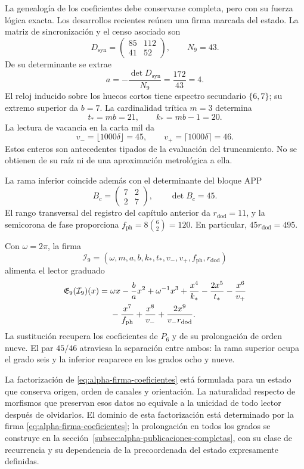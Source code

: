 La genealogía de los coeficientes debe conservarse completa, pero con su
fuerza lógica exacta. Los desarrollos recientes reúnen una firma marcada
del estado. La matriz de sincronización y el censo asociado son
\[
 D_{\mathrm{syn}}=\begin{pmatrix}85&112\\41&52\end{pmatrix},
 \qquad N_9=43.
\]
De su determinante se extrae
\[
 a=-\frac{\det D_{\mathrm{syn}}}{N_9}
   =\frac{172}{43}=4.
\]
El reloj inducido sobre los huecos cortos tiene espectro secundario
\(\{6,7\}\); su extremo superior da \(b=7\). La cardinalidad
trítica \(m=3\) determina
\[
 t_*=mb=21,\qquad k_*=mb-1=20.
\]
La lectura de vacancia en la carta mil da
\[
 v_-=\lfloor1000\delta\rfloor=45,\qquad
 v_+=\lceil1000\delta\rceil=46.
\]
Estos enteros son antecedentes tipados de la evaluación del truncamiento. No se
obtienen de su raíz ni de una aproximación metrológica a ella.

La rama inferior coincide además con el determinante del bloque APP
\[
 B_c=\begin{pmatrix}7&2\\2&7\end{pmatrix},\qquad\det B_c=45.
\]
El rango transversal del registro del capítulo anterior da
\(r_{\mathrm{dod}}=11\), y la semicorona de fase proporciona
\(f_{\mathrm{ph}}=8\binom62=120\). En particular,
\(45r_{\mathrm{dod}}=495\).

Con \(\omega=2\pi\), la firma
\[
 \mathcal I_9=(\omega,m,a,b,k_*,t_*,v_-,v_+,f_{\mathrm{ph}},r_{\mathrm{dod}})
\]
alimenta el lector graduado
\begin{align}
 \mathfrak E_9(\mathcal I_9)(x)
 ={}&\omega x-\frac ba x^2+\omega^{-1}x^3
 +\frac{x^4}{k_*}-\frac{2x^5}{t_*}-\frac{x^6}{v_+}\notag\\
 &-\frac{x^7}{f_{\mathrm{ph}}}+\frac{x^8}{v_-}
 +\frac{2x^9}{v_-r_{\mathrm{dod}}}.
 \label{eq:alpha-firma-coeficientes}
\end{align}
La sustitución recupera los coeficientes de \(P_6\) y de su
prolongación de orden nueve. El par \(45/46\) atraviesa la separación
entre ambos: la rama superior ocupa el grado seis y la inferior reaparece
en los grados ocho y nueve.

La factorización de \eqref{eq:alpha-firma-coeficientes} está formulada
para un estado que conserva origen, orden de canales y orientación. La
naturalidad respecto de morfismos que preservan esos datos no equivale a
la unicidad de todo lector después de olvidarlos. El dominio de esta
factorización está determinado por la firma
\eqref{eq:alpha-firma-coeficientes}; la prolongación en todos los grados
se construye en la sección~\ref{subsec:alpha-publicaciones-completas},
con su clase de recurrencia y su dependencia de la precoordenada del estado
expresamente definidas.

